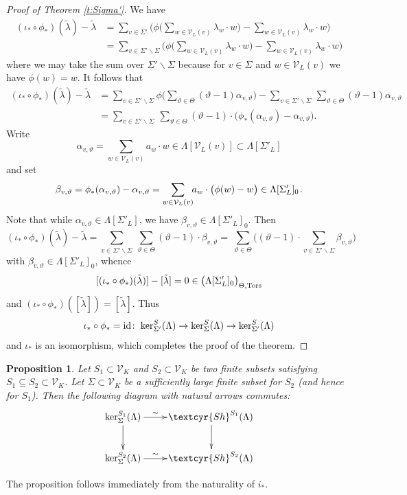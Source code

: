 \documentclass[11pt]{amsart}
\newcommand{\Sha}{{\!\textcyr{Sh}}}
\theoremstyle{plain}
\newtheorem{proposition}[theorem]{Proposition}
\theoremstyle{definition}
\newcommand{\hs}{\kern 0.8pt}
\newcommand{\id}{{\rm id}}
\newcommand{\V}{{\mathcal V}}
\newcommand{\Tors}{{\rm Tors}}
\newcommand{\Tht}{{\Theta,\Tors}}
\newcommand{\vt}{{\vartheta}}
\newcommand{\lambdatil}{{\tilde\lambda}}
\begin{document}
\begin{proof}[Proof of Theorem \ref{t:Sigma'}]
We have
\begin{align*}
(\iota_*\circ\phi_*)(\lambdatil)-\lambdatil
&=\sum_{v\in\Sigma'}\bigg( \phi\Big(\sum_{w\in\V_L(v)}\!\!\lambda_w\cdot w\Big)
   -\sum_{w\in\V_L(v)}\!\!\lambda_w\cdot w\bigg)\\
&=\sum_{v\in\Sigma'\smallsetminus\Sigma}\bigg( \phi\Big(\sum_{w\in\V_L(v)}\!\!\lambda_w\cdot w\Big)
   -\sum_{w\in\V_L(v)}\!\!\lambda_w\cdot w\bigg)
\end{align*}
where we may take the sum over $\Sigma'\smallsetminus\Sigma$
because for $v\in\Sigma$ and $w\in\V_L(v)$ we have $\phi(w)=w$.
It follows that
\begin{align*}
(\iota_*\circ\phi_*)(\lambdatil)-\lambdatil
&=\sum_{v\in\Sigma'\smallsetminus\Sigma}\phi\Big(\sum_{\vt\in\Theta}(\vt-1)\alpha_{v,\vt}\Big)
   -\sum_{v\in\Sigma'\smallsetminus\Sigma\ }\sum_{\vt\in\Theta}(\vt-1)\alpha_{v,\vt}\\
&=   \sum_{v\in\Sigma'\smallsetminus\Sigma}
    \ \sum_{\vt\in\Theta}(\vt-1)\cdot\big(\phi_*(\alpha_{v,\vt})-\alpha_{v,\vt}\big).
    \end{align*}
Write
\[\alpha_{v,\vt}=\sum_{w\in \V_L(v)}\!\! a_w\cdot w\in \Lambda[\V_L(v)]\subset \Lambda[\Sigma'_L] \]
and set
\[\beta_{v,\vartheta}=\phi_*(\alpha_{v,\vt})-\alpha_{v,\vt}=
         \sum_{w\in \V_L(v)}\!\! a_w\cdot \big(\phi(w)-w\big)\in \Lambda[\Sigma'_L]_0\hs.\]
Note that while $\alpha_{v,\vt}\in \Lambda[\Sigma'_L]$, we have
$\beta_{v,\vartheta}\in \Lambda[\Sigma'_L]_0$\hs.
Then
\[(\iota_*\circ\phi_*)(\lambdatil)-\lambdatil=
     \sum_{v\in\Sigma'\smallsetminus\Sigma}
     \ \sum_{\vt\in\Theta}(\vt-1)\cdot\beta_{v,\vt}
     =\ \sum_{\vt\in\Theta}\bigg((\vt-1)
     \cdot\!\!\!\!\sum_{v\in\Sigma'\smallsetminus\Sigma}\!\!\!\beta_{v,\vt}\bigg)
     \]
 with $\beta_{v,\vt}\in \Lambda[\Sigma'_L]_0$\hs, whence
\[ [(\iota_*\circ\phi_*)(\lambdatil)]-[\lambdatil]=0\in \big(\Lambda[\Sigma'_L]_0\big)_\Tht\]
and $(\iota_*\circ\phi_*)([\lambdatil])=[\lambdatil]$.
Thus
\[\iota_*\circ \phi_*=\id\colon\hs \ker^S_{\Sigma'}(\Lambda)\to\ker^S_{\Sigma}(\Lambda)\to \ker^S_{\Sigma'}(\Lambda)\]
and $\iota_*$ is an isomorphism, which completes the proof of the theorem.
\end{proof}

\begin{proposition}
Let $S_1\subset \V_K$ and $S_2\subset \V_K$ be two finite subsets
satisfying  $S_1\subseteq S_2\subset\V_K$.
Let $\Sigma\subset \V_K$ be a sufficiently large finite subset
for $S_2$ (and hence for  $S_1$).
Then the following diagram with natural arrows commutes:
\[
\xymatrix{
\ker_\Sigma^{S_1}(\Lambda)\ar[r]^-\sim\ar[d]  & \Sha^{S_1}(\Lambda)\ar[d]\\
\ker_\Sigma^{S_2}(\Lambda)\ar[r]^-\sim  & \Sha^{S_2}(\Lambda)
}
\]
\end{proposition}
The proposition follows immediately from the naturality of $i_*$.
\end{document}

